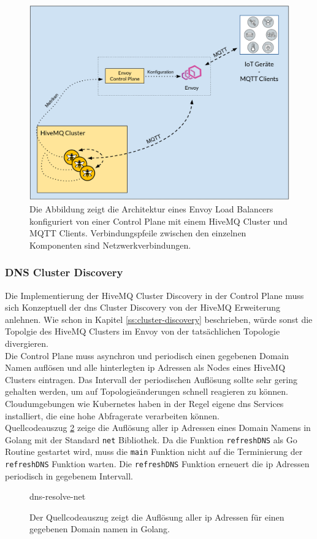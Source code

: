 \begin{figure}
    \centering
    \includegraphics[scale=0.36]{images/control-plane-architecture.png}
    \caption{Die Abbildung zeigt die Architektur eines Envoy Load Balancers konfiguriert von einer Control Plane mit einem HiveMQ Cluster und MQTT Clients. Verbindungspfeile zwischen den einzelnen Komponenten sind Netzwerkverbindungen.}
    \label{fig:control-plane-architecture}
\end{figure}

\subsubsection{DNS Cluster Discovery} \label{ss:dns-discovery}
Die Implementierung der HiveMQ Cluster Discovery in der Control Plane muss sich Konzeptuell der \ac{dns} Cluster Discovery von der HiveMQ Erweiterung anlehnen. Wie schon in Kapitel \ref{ss:cluster-discovery} beschrieben, würde sonst die Topolgie des HiveMQ Clusters im Envoy von der tatsächlichen Topologie divergieren.
\\
Die Control Plane muss asynchron und periodisch einen gegebenen Domain Namen auflösen und alle hinterlegten \ac{ip} Adressen als Nodes eines HiveMQ Clusters eintragen. Das Intervall der periodischen Auflösung sollte sehr gering gehalten werden, um auf Topologieänderungen schnell reagieren zu können.
Cloudumgebungen wie Kubernetes haben in der Regel eigene \ac{dns} Services installiert, die eine hohe Abfragerate verarbeiten können.
\\
Quellcodeauszug \ref{code:dns-resolve-net} zeige die Auflösung aller \ac{ip} Adressen eines Domain Namens in Golang mit der Standard \verb|net| Bibliothek. Da die Funktion \verb|refreshDNS| als Go Routine gestartet wird, muss die \verb|main| Funktion nicht auf die Terminierung der \verb|refreshDNS| Funktion warten. Die \verb|refreshDNS| Funktion erneuert die \ac{ip} Adressen periodisch in gegebenem Intervall.
\begin{figure}
    {dns-resolve-net}
    \caption{Der Quellcodeauszug zeigt die Auflösung aller \ac{ip} Adressen für einen gegebenen Domain namen in Golang.}
    \label{code:dns-resolve-net}
\end{figure}

